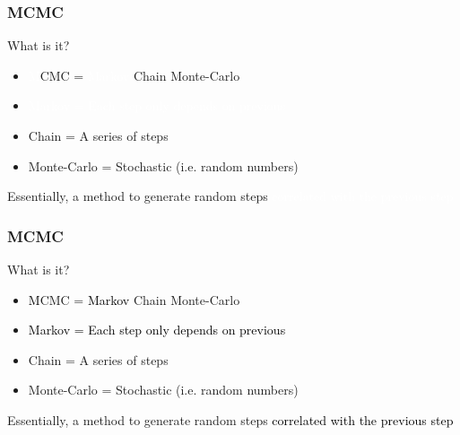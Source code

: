 \documentclass[mathserif]{beamer}
\begin{document}
\begin{frame}
\frametitle{MCMC}

\begin{block}{What is it?}
\begin{itemize}
\item \textcolor{white}{M}CMC = \textcolor{white}{Markov} Chain Monte-Carlo
\item \textcolor{white}{Markov = Each step only depends on previous}
\item Chain = A series of steps
\item Monte-Carlo = Stochastic (i.e. random numbers)
\end{itemize}
Essentially, a method to generate random steps \textcolor{white}{correlated with the previous step}
\end{block}
\end{frame}

\begin{frame}
  \frametitle{MCMC}

  \begin{block}{What is it?}
    \begin{itemize}
    \item \textcolor{black}{M}CMC = \textcolor{black}{Markov} Chain Monte-Carlo
    \item \textcolor{black}{Markov = Each step only depends on previous}
    \item Chain = A series of steps
    \item Monte-Carlo = Stochastic (i.e. random numbers)
    \end{itemize}
    Essentially, a method to generate random steps \textcolor{black}{correlated with the previous step}

  \end{block}
\end{frame}
\end{document}
